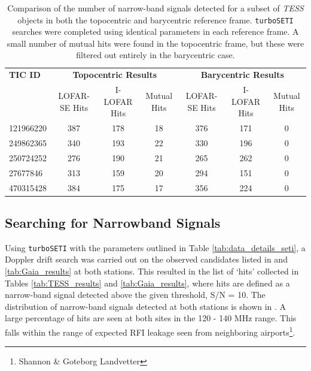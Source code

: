\begin{table}[ht]
  \centering
  \begin{tabular}{lccc|ccc}
  \hline
  \textbf{TIC ID} & \multicolumn{3}{c|}{\textbf{Topocentric Results}} & \multicolumn{3}{c}{\textbf{Barycentric Results}} \\
   & LOFAR-SE Hits & I-LOFAR Hits & Mutual Hits & LOFAR-SE Hits & I-LOFAR Hits & Mutual Hits \\
  \hline
  121966220 & 387 & 178 & 18 & 376 & 171 & 0 \\
  249862365 & 340 & 193 & 22 & 330 & 196 & 0 \\
  250724252 & 276 & 190 & 21 & 265 & 262 & 0 \\
  27677846  & 313 & 159 & 20 & 294 & 151 & 0 \\
  470315428 & 384 & 175 & 17 & 356 & 224 & 0 \\
  \hline
  \end{tabular}
  \caption[Topocentric and barycentric signal comparison]{Comparison of the number of narrow-band signals detected for a subset of \textit{TESS} objects in both the topocentric and barycentric reference frame. \texttt{turboSETI} searches were completed using identical parameters in each reference frame. A small number of mutual hits were found in the topocentric frame, but these were filtered out entirely in the barycentric case.}
  \label{tab:narrowband_hit_bary_non_bary_compare}
  \end{table}
  

\subsection{Searching for Narrowband Signals}
Using \verb|turboSETI| with the parameters outlined in Table \ref{tab:data_details_seti}, a Doppler drift search was carried out on the observed candidates listed in  and \ref{tab:Gaia_results} at both stations. This resulted in the list of `hits' collected in Tables \ref{tab:TESS_results} and \ref{tab:Gaia_results}, where hits are defined as a narrow-band signal detected above the given threshold, S/N = 10. The distribution of narrow-band signals detected at both stations is shown in . A large percentage of hits are seen at both sites in the 120 - 140 MHz range. This falls within the range of expected RFI leakage seen from neighboring airports\footnote{Shannon \& Goteborg Landvetter}. \\


